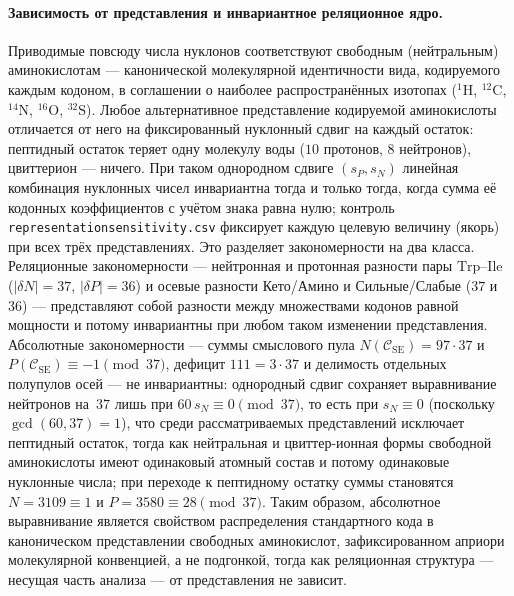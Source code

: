 \documentclass[11pt,a4paper]{article}
\renewcommand{\_}{\origunderscore\allowbreak}
\begin{document}
\paragraph{Зависимость от представления и инвариантное реляционное ядро.}
Приводимые повсюду числа нуклонов соответствуют свободным (нейтральным) аминокислотам --- канонической молекулярной идентичности вида, кодируемого каждым кодоном, в соглашении о наиболее распространённых изотопах ($^1\mathrm{H}$, $^{12}\mathrm{C}$, $^{14}\mathrm{N}$, $^{16}\mathrm{O}$, $^{32}\mathrm{S}$). Любое альтернативное представление кодируемой аминокислоты отличается от него на фиксированный нуклонный сдвиг на каждый остаток: пептидный остаток теряет одну молекулу воды ($10$ протонов, $8$ нейтронов), цвиттерион --- ничего. При таком однородном сдвиге $(s_P, s_N)$ линейная комбинация нуклонных чисел инвариантна тогда и только тогда, когда сумма её кодонных коэффициентов с учётом знака равна нулю; контроль \texttt{representation\_sensitivity.csv} фиксирует каждую целевую величину (якорь) при всех трёх представлениях. Это разделяет закономерности на два класса. Реляционные закономерности --- нейтронная и протонная разности пары $\mathrm{Trp}$--$\mathrm{Ile}$ ($|\delta N| = 37$, $|\delta P| = 36$) и осевые разности Кето/Амино и Сильные/Слабые ($37$ и $36$) --- представляют собой разности между множествами кодонов равной мощности и потому инвариантны при любом таком изменении представления. Абсолютные закономерности --- суммы смыслового пула $N(\mathcal{C}_{\mathrm{SE}}) = 97 \cdot 37$ и $P(\mathcal{C}_{\mathrm{SE}}) \equiv -1 \pmod{37}$, дефицит $111 = 3 \cdot 37$ и делимость отдельных полупулов осей --- не инвариантны: однородный сдвиг сохраняет выравнивание нейтронов на~$37$ лишь при $60\,s_N \equiv 0 \pmod{37}$, то есть при $s_N \equiv 0$ (поскольку $\gcd(60, 37) = 1$), что среди рассматриваемых представлений исключает пептидный остаток, тогда как нейтральная и цвиттер-ионная формы свободной аминокислоты имеют одинаковый атомный состав и потому одинаковые нуклонные числа; при переходе к пептидному остатку суммы становятся $N = 3109 \equiv 1$ и $P = 3580 \equiv 28 \pmod{37}$. Таким образом, абсолютное выравнивание является свойством распределения стандартного кода в каноническом представлении свободных аминокислот, зафиксированном априори молекулярной конвенцией, а не подгонкой, тогда как реляционная структура --- несущая часть анализа --- от представления не зависит.
\end{document}
